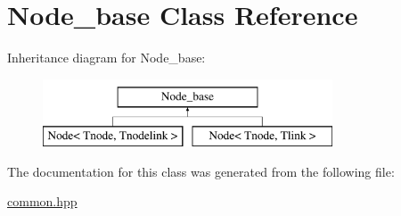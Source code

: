 \hypertarget{classNode__base}{\section{Node\-\_\-base Class Reference}
\label{classNode__base}
}
Inheritance diagram for Node\-\_\-base\-:\begin{figure}[H]
\begin{center}
\leavevmode
\includegraphics[height=2.000000cm]{classNode__base}
\end{center}
\end{figure}


The documentation for this class was generated from the following file\-:\begin{DoxyCompactItemize}
\item 
\hyperlink{common_8hpp}{common.\-hpp}\end{DoxyCompactItemize}
